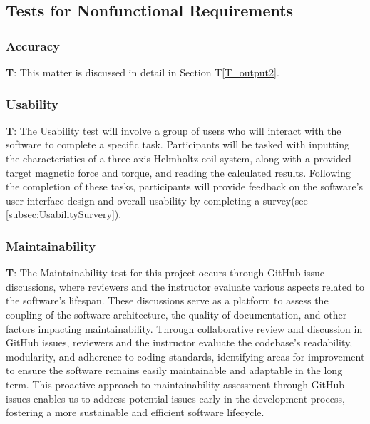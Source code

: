 \documentclass[12pt, titlepage]{article}
\newcounter{testCase}
\newcommand{\testCaseFormat}{T\thetestCase}
\begin{document}
\subsection{Tests for Nonfunctional Requirements}

\subsubsection{Accuracy}\label{subsec:Accuracy}
\textbf{\testCaseFormat \label{T_accu}}: This matter is discussed in detail in Section T\ref{T_output2}.

\subsubsection{Usability}\label{subsec:Usability}
\textbf{\testCaseFormat \label{T_usab}}: The Usability test will involve a group of users who will interact with the software to complete a specific task. Participants will be tasked with inputting the characteristics of a three-axis Helmholtz coil system, along with a provided target magnetic force and torque, and reading the calculated results. Following the completion of these tasks, participants will provide feedback on the software's user interface design and overall usability by completing a survey(see \ref{subsec:UsabilitySurvery}).
\subsubsection{Maintainability}\label{subsec:Maintainability}
\textbf{\testCaseFormat \label{T_maint}}: The Maintainability test for this project occurs through GitHub issue discussions, where reviewers and the instructor evaluate various aspects related to the software's lifespan. These discussions serve as a platform to assess the coupling of the software architecture, the quality of documentation, and other factors impacting maintainability. Through collaborative review and discussion in GitHub issues, reviewers and the instructor evaluate the codebase's readability, modularity, and adherence to coding standards, identifying areas for improvement to ensure the software remains easily maintainable and adaptable in the long term. This proactive approach to maintainability assessment through GitHub issues enables us to address potential issues early in the development process, fostering a more sustainable and efficient software lifecycle.
\end{document}
